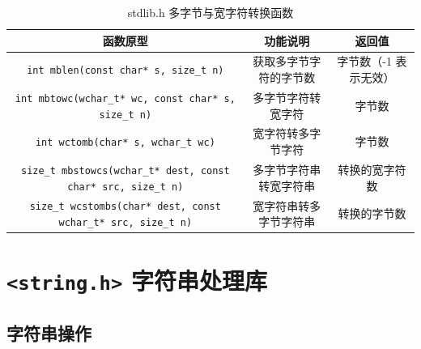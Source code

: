 \begin{table}[H]
\centering
\small
\renewcommand{\arraystretch}{1.5}
\begin{tabulary}{\linewidth}{CCC}
\toprule
\textbf{函数原型} & \textbf{功能说明} & \textbf{返回值} \\ \midrule
\texttt{int mblen(const char* s, size\_t n)} & 获取多字节字符的字节数 & 字节数（-1 表示无效） \\ 
\texttt{int mbtowc(wchar\_t* wc, const char* s, size\_t n)} & 多字节字符转宽字符 & 字节数 \\ 
\texttt{int wctomb(char* s, wchar\_t wc)} & 宽字符转多字节字符 & 字节数 \\ 
\texttt{size\_t mbstowcs(wchar\_t* dest, const char* src, size\_t n)} & 多字节字符串转宽字符串 & 转换的宽字符数 \\ 
\texttt{size\_t wcstombs(char* dest, const wchar\_t* src, size\_t n)} & 宽字符串转多字节字符串 & 转换的字节数 \\ \bottomrule
\end{tabulary}
\caption{stdlib.h 多字节与宽字符转换函数}
\label{tab:stdlib_mb}
\end{table}

\section{\texorpdfstring{\texttt{<string.h>} 字符串处理库}{<string.h> 字符串处理库}}

\subsection{字符串操作}

